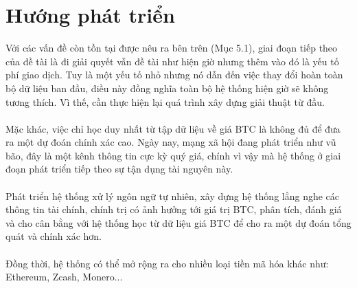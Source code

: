 \section{Hướng phát triển}
Với các vấn đề còn tồn tại được nêu ra bên trên (Mục 5.1), giai đoạn tiếp theo 
của đề tài là đi giải quyết vẫn đề tài như hiện giờ nhưng thêm vào đó là yếu 
tố phí giao dịch. Tuy là một yếu tố nhỏ nhưng nó dẫn đến việc thay đổi hoàn toàn 
bộ dữ liệu ban đầu, điều này đồng nghĩa toàn bộ hệ thống hiện giờ sẽ không 
tương thích. Vì thế, cần thực hiện lại quá trình xây dựng giải thuật từ đầu.\\\\
Mặc khác, việc chỉ học duy nhất từ tập dữ liệu về giá BTC là không đủ để 
đưa ra một dự đoán chính xác cao. Ngày nay, mạng xã hội đang phát triển như vũ 
bão, đây là một kênh thông tin cực kỳ quý giá, chính vì vậy mà hệ thống ở giai 
đoạn phát triển tiếp theo sự tận dụng tài nguyên này.\\\\
Phát triển hệ thống xử lý ngôn ngữ tự nhiên, xây dựng hệ thống lắng nghe các 
thông tin tài chính, chính trị có ảnh hưởng tới giá trị BTC, phân tích, 
đánh giá và cho cân bằng với hệ thống học từ dữ liệu giá BTC để cho ra một 
dự đoán tổng quát và chính xác hơn.\\\\
Đồng thời, hệ thống có thể mở rộng ra cho nhiều loại tiền mã hóa khác như: 
Ethereum, Zcash, Monero...